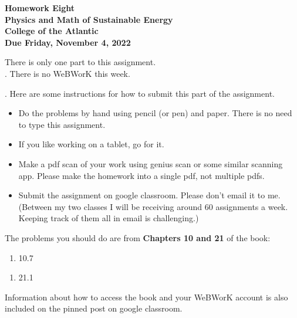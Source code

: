 \documentclass[12pt]{article}
\begin{document}
\pagestyle{empty}
 
\begin{center}
{\LARGE {\bf Homework Eight}}\\
\bigskip
{\Large {\bf Physics and Math of Sustainable Energy}}\\
\bigskip
{\Large {\bf College of the Atlantic}}\\
\bigskip
{ {\bf Due Friday, November 4, 2022}}\\ 
\end{center}
\medskip


\noindent There is only one part to this assignment.\\

. There is no WeBWorK this week. 



.  Here are some
instructions for how to submit this part of the assignment.
\begin{itemize}
\item Do the problems by hand using pencil (or pen) and paper.
  There is no need to type this assignment.
\item If you like working on a tablet, go for it. 
\item Make a pdf scan of your work using genius scan or some
  similar scanning app.  Please make the homework into a single
  pdf, not multiple pdfs.
\item Submit the assignment on google classroom.  Please don't
  email it to me.  (Between my two classes I will be receiving
  around 60 assignments a week.  Keeping track of them all in email 
  is challenging.)\\
\end{itemize}

\noindent The problems you should do are from {\bf Chapters 10 and
  21} of the book:  \\

\begin{enumerate}
\setlength{\itemsep}{-1mm}
\item 10.7
\end{enumerate}


\begin{enumerate}
  \setlength{\itemsep}{-1mm}
\item 21.1
\end{enumerate}


\noindent Information about how to access the book and your WeBWorK
account is also included on the pinned post on google classroom. 
\end{document}
